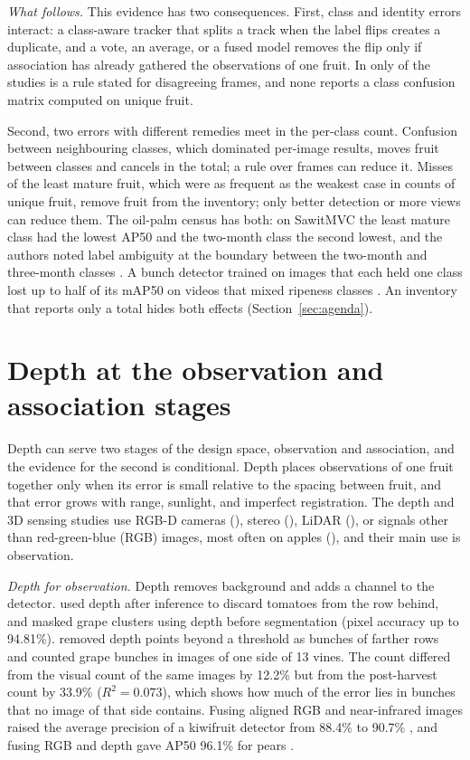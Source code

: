 \textit{What follows.} This evidence has two consequences. First, class and identity errors interact: a class-aware tracker that splits a track when the label flips creates a duplicate, and a vote, an average, or a fused model removes the flip only if association has already gathered the observations of one fruit. In only \nClassVote of the \nPerClass studies is a rule stated for disagreeing frames, and none reports a class confusion matrix computed on unique fruit.

Second, two errors with different remedies meet in the per-class count. Confusion between neighbouring classes, which dominated per-image results, moves fruit between classes and cancels in the total; a rule over frames can reduce it. Misses of the least mature fruit, which were as frequent as the weakest case in counts of unique fruit, remove fruit from the inventory; only better detection or more views can reduce them. The oil-palm census has both: on SawitMVC the least mature class had the lowest AP50 and the two-month class the second lowest, and the authors noted label ambiguity at the boundary between the two-month and three-month classes \citep{indriani2026sawitmvc}. A bunch detector trained on images that each held one class lost up to half of its mAP50 on videos that mixed ripeness classes \citep{junior2023video}. An inventory that reports only a total hides both effects (Section~\ref{sec:agenda}).

\section{Depth at the observation and association stages}\label{sec:depth}

Depth can serve two stages of the design space, observation and association, and the evidence for the second is conditional. Depth places observations of one fruit together only when its error is small relative to the spacing between fruit, and that error grows with range, sunlight, and imperfect registration. The \nDepth depth and 3D sensing studies use RGB-D cameras (\nDepthRgbd), stereo (\nDepthStereo), LiDAR (\nDepthLidar), or signals other than red-green-blue (RGB) images, most often on apples (\nDepthApple), and their main use is observation.

\textit{Depth for observation.} Depth removes background and adds a channel to the detector. \citet{afonso2020tomato} used depth after inference to discard tomatoes from the row behind, and \citet{barbole2024comparative} masked grape clusters using depth before segmentation (pixel accuracy up to 94.81\%). \citet{devanna2025yield} removed depth points beyond a threshold as bunches of farther rows and counted grape bunches in images of one side of 13 vines. The count differed from the visual count of the same images by 12.2\% but from the post-harvest count by 33.9\% ($R^2=0.073$), which shows how much of the error lies in bunches that no image of that side contains. Fusing aligned RGB and near-infrared images raised the average precision of a kiwifruit detector from 88.4\% to 90.7\% \citep{liu2020improved}, and fusing RGB and depth gave AP50 96.1\% for pears \citep{ling2026boosting}.

